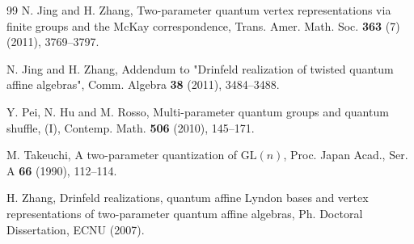 \documentclass[12pt]{amsart}
\numberwithin{equation}{section}
\numberwithin{equation}{section}
\begin{document}
\begin{thebibliography}{99}
N. Jing and H. Zhang, Two-parameter quantum vertex representations via finite groups and the McKay correspondence, Trans. Amer. Math. Soc. \textbf{363} (7) (2011), 3769--3797.

N. Jing and H. Zhang, Addendum to "Drinfeld realization of twisted quantum affine algebras", Comm. Algebra \textbf{38} (2011), 3484--3488.

Y. Pei, N. Hu and M. Rosso, Multi-parameter quantum groups and quantum shuffle, (I), Contemp. Math. \textbf{506} (2010), 145--171.

M. Takeuchi, A two-parameter quantization of $\text{GL}(n)$, Proc. Japan Acad., Ser. A \textbf{66} (1990), 112--114.

H. Zhang, Drinfeld realizations, quantum affine Lyndon bases and vertex representations of two-parameter quantum affine algebras, Ph. Doctoral Dissertation, ECNU (2007).
\end{thebibliography}



\end{document}
